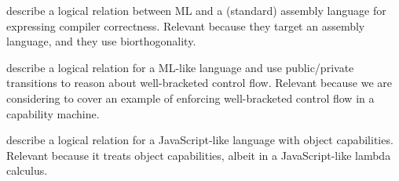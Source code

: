 \documentclass[a4paper]{article}
\begin{document}
\cite{Hur:2011:KLR:1926385.1926402} describe a logical relation between ML and
a (standard) assembly language for expressing compiler correctness.  Relevant
because they target an assembly language, and they use biorthogonality.

\cite{Dreyer:2010:IHS:1863543.1863566} describe a logical relation for a ML-like
language and use public/private transitions to reason about well-bracketed
control flow. Relevant because we are considering to cover an example of
enforcing well-bracketed control flow in a capability machine.

\cite{Devriese:2016ObjCap} describe a logical relation for a JavaScript-like
language with object capabilities.  Relevant because it treats object
capabilities, albeit in a JavaScript-like lambda calculus.



\end{document}
